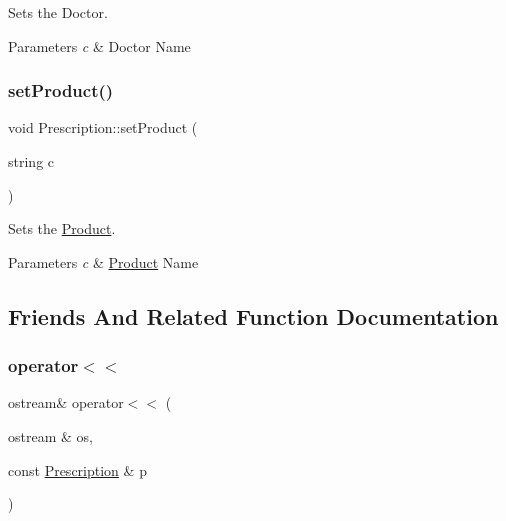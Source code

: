 Sets the Doctor. 


\begin{DoxyParams}{Parameters}
{\em c} & Doctor Name \\
\hline
\end{DoxyParams}
\mbox{\label{classPrescription_a2594567d8bbb03cf18710db571c0cb64}} 
\subsubsection{\texorpdfstring{set\+Product()}{setProduct()}}
{\footnotesize\ttfamily void Prescription\+::set\+Product (\begin{DoxyParamCaption}\item[{string}]{c }\end{DoxyParamCaption})}



Sets the \hyperlink{classProduct}{Product}. 


\begin{DoxyParams}{Parameters}
{\em c} & \hyperlink{classProduct}{Product} Name \\
\hline
\end{DoxyParams}


\subsection{Friends And Related Function Documentation}
\mbox{\label{classPrescription_a3daeb997a2f3f9666159cf018d0d1c28}} 
\subsubsection{\texorpdfstring{operator$<$$<$}{operator<<}\hspace{0.1cm}{\footnotesize\ttfamily [1/2]}}
{\footnotesize\ttfamily ostream\& operator$<$$<$ (\begin{DoxyParamCaption}\item[{ostream \&}]{os,  }\item[{const \hyperlink{classPrescription}{Prescription} \&}]{p }\end{DoxyParamCaption})\hspace{0.3cm}{\ttfamily [friend]}}

